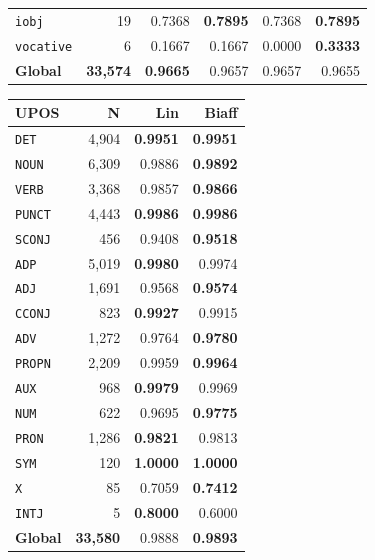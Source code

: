 \begin{table}[ht]
\begin{minipage}[t]{0.60\linewidth}
\begin{tabular}{l r  r r r r}
\texttt{iobj} & 19 & 0.7368 & \textbf{0.7895} & 0.7368 & \textbf{0.7895} \\
\texttt{vocative} & 6 & 0.1667 & 0.1667 & 0.0000 & \textbf{0.3333} \\
\midrule
\textbf{Global} & \textbf{33,574} & \textbf{0.9665} & 0.9657 & 0.9657 & 0.9655 \\
\bottomrule
\end{tabular}
\end{minipage}
\hfill
\begin{minipage}[t]{0.37\linewidth}
\centering
\begin{tabular}{l r  r r}
\toprule
\textbf{UPOS} & \textbf{N} & \textbf{Lin} & \textbf{Biaff} \\
\midrule
\texttt{DET} & 4,904 & \textbf{0.9951} & \textbf{0.9951} \\
\texttt{NOUN} & 6,309 & 0.9886 & \textbf{0.9892} \\
\texttt{VERB} & 3,368 & 0.9857 & \textbf{0.9866} \\
\texttt{PUNCT} & 4,443 & \textbf{0.9986} & \textbf{0.9986} \\
\texttt{SCONJ} & 456 & 0.9408 & \textbf{0.9518} \\
\texttt{ADP} & 5,019 & \textbf{0.9980} & 0.9974 \\
\texttt{ADJ} & 1,691 & 0.9568 & \textbf{0.9574} \\
\texttt{CCONJ} & 823 & \textbf{0.9927} & 0.9915 \\
\texttt{ADV} & 1,272 & 0.9764 & \textbf{0.9780} \\
\texttt{PROPN} & 2,209 & 0.9959 & \textbf{0.9964} \\
\texttt{AUX} & 968 & \textbf{0.9979} & 0.9969 \\
\texttt{NUM} & 622 & 0.9695 & \textbf{0.9775} \\
\texttt{PRON} & 1,286 & \textbf{0.9821} & 0.9813 \\
\texttt{SYM} & 120 & \textbf{1.0000} & \textbf{1.0000} \\
\texttt{X} & 85 & 0.7059 & \textbf{0.7412} \\
\texttt{INTJ} & 5 & \textbf{0.8000} & 0.6000 \\
\midrule
\textbf{Global} & \textbf{33,580} & 0.9888 & \textbf{0.9893} \\
\bottomrule
\end{tabular}
\end{minipage}
\end{table}



